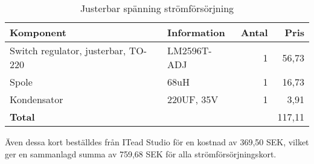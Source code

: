 \begin{table}[htbp]
\caption{Justerbar spänning strömförsörjning}
\begin{tabular}{|l|l|r|r|}
\hline
\textbf{Komponent} & \textbf{Information} & \textbf{Antal} & \textbf{Pris} \\
\hline
Switch regulator, justerbar, TO-220  & LM2596T-ADJ  & 1 & 56,73 \\ 
\hline
Spole  & 68uH & 1 & 16,73 \\ 
\hline
Kondensator & 220UF, 35V  & 1 & 3,91 \\ 
\hline
\textbf{Total} &  & \multicolumn{1}{l|}{} & 117,11 \\ 
\hline
\end{tabular}
\label{justerbar}
\end{table}

Även dessa kort beställdes från ITead Studio för en kostnad av 369,50 SEK, vilket ger en sammanlagd summa av 759,68 SEK för alla strömförsörjningskort.



